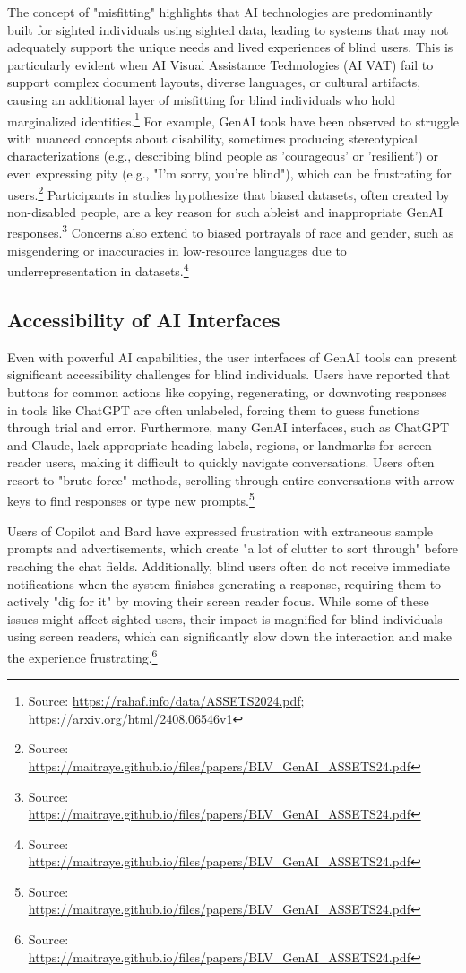 The concept of "misfitting" highlights that AI technologies are predominantly built for sighted individuals using sighted data, leading to systems that may not adequately support the unique needs and lived experiences of blind users. This is particularly evident when AI Visual Assistance Technologies (AI VAT) fail to support complex document layouts, diverse languages, or cultural artifacts, causing an additional layer of misfitting for blind individuals who hold marginalized identities.\footnote{Source: \url{https://rahaf.info/data/ASSETS2024.pdf}; \url{https://arxiv.org/html/2408.06546v1}} For example, GenAI tools have been observed to struggle with nuanced concepts about disability, sometimes producing stereotypical characterizations (e.g., describing blind people as 'courageous' or 'resilient') or even expressing pity (e.g., "I'm sorry, you're blind"), which can be frustrating for users.\footnote{Source: \url{https://maitraye.github.io/files/papers/BLV_GenAI_ASSETS24.pdf}} Participants in studies hypothesize that biased datasets, often created by non-disabled people, are a key reason for such ableist and inappropriate GenAI responses.\footnote{Source: \url{https://maitraye.github.io/files/papers/BLV_GenAI_ASSETS24.pdf}} Concerns also extend to biased portrayals of race and gender, such as misgendering or inaccuracies in low-resource languages due to underrepresentation in datasets.\footnote{Source: \url{https://maitraye.github.io/files/papers/BLV_GenAI_ASSETS24.pdf}}

\subsection{Accessibility of AI Interfaces}

Even with powerful AI capabilities, the user interfaces of GenAI tools can present significant accessibility challenges for blind individuals. Users have reported that buttons for common actions like copying, regenerating, or downvoting responses in tools like ChatGPT are often unlabeled, forcing them to guess functions through trial and error. Furthermore, many GenAI interfaces, such as ChatGPT and Claude, lack appropriate heading labels, regions, or landmarks for screen reader users, making it difficult to quickly navigate conversations. Users often resort to "brute force" methods, scrolling through entire conversations with arrow keys to find responses or type new prompts.\footnote{Source: \url{https://maitraye.github.io/files/papers/BLV_GenAI_ASSETS24.pdf}}

Users of Copilot and Bard have expressed frustration with extraneous sample prompts and advertisements, which create "a lot of clutter to sort through" before reaching the chat fields. Additionally, blind users often do not receive immediate notifications when the system finishes generating a response, requiring them to actively "dig for it" by moving their screen reader focus. While some of these issues might affect sighted users, their impact is magnified for blind individuals using screen readers, which can significantly slow down the interaction and make the experience frustrating.\footnote{Source: \url{https://maitraye.github.io/files/papers/BLV_GenAI_ASSETS24.pdf}}

